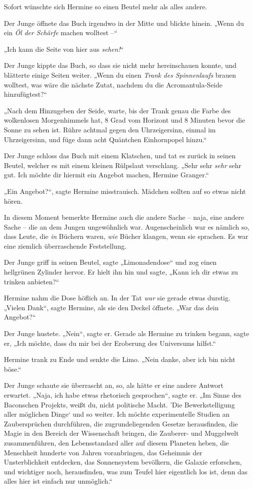 Sofort wünschte sich Hermine so einen Beutel mehr als alles andere. 

Der Junge öffnete das Buch irgendwo in der Mitte und blickte hinein. „Wenn du ein \emph{Öl der Schärfe} machen wolltest –“ 

„Ich kann die Seite von hier aus \emph{sehen!}“ 

Der Junge kippte das Buch, so dass sie nicht mehr hereinschauen konnte, und blätterte einige Seiten weiter. „Wenn du einen \emph{Trank des Spinnenlaufs} brauen wolltest, was wäre die nächste Zutat, nachdem du die Acromantula-Seide hinzufügtest?“ 

„Nach dem Hinzugeben der Seide, warte, bis der Trank genau die Farbe des wolkenlosen Morgenhimmels hat, 8 Grad vom Horizont und 8 Minuten bevor die Sonne zu sehen ist. Rühre achtmal gegen den Uhrzeigersinn, einmal im Uhrzeigersinn, und füge dann acht Quäntchen Einhornpopel hinzu.“ 

Der Junge schloss das Buch mit einem Klatschen, und tat es zurück in seinen Beutel, welcher es mit einem kleinen Rülpslaut verschlang. „Sehr sehr \emph{sehr} sehr gut. Ich möchte dir hiermit ein Angebot machen, Hermine Granger.“ 

„Ein Angebot?“, sagte Hermine misstrauisch. Mädchen sollten auf so etwas nicht hören. 

In diesem Moment bemerkte Hermine auch die andere Sache – naja, eine andere Sache – die an dem Jungen ungewöhnlich war. Augenscheinlich war es nämlich so, dass Leute, die \emph{in} Büchern waren, \emph{wie} Bücher klangen, wenn sie sprachen. Es war eine ziemlich überraschende Feststellung. 

Der Junge griff in seinen Beutel, sagte „Limonadendose“ und zog einen hellgrünen Zylinder hervor. Er hielt ihn hin und sagte, „Kann ich dir etwas zu trinken anbieten?“ 

Hermine nahm die Dose höflich an. In der Tat \emph{war} sie gerade etwas durstig. „Vielen Dank“, sagte Hermine, als sie den Deckel öffnete. „War das dein Angebot?“ 

Der Junge hustete. „Nein“, sagte er. Gerade als Hermine zu trinken begann, sagte er, „Ich möchte, dass du mir bei der Eroberung des Universums hilfst.“ 

Hermine trank zu Ende und senkte die Limo. „Nein danke, aber ich bin nicht böse.“ 

Der Junge schaute sie überrascht an, so, als hätte er eine andere Antwort erwartet. „Naja, ich habe etwas rhetorisch gesprochen“, sagte er. „Im Sinne des Baconschen Projekts, weißt du, nicht politische Macht. ’Die Bewerkstelligung aller möglichen Dinge‘ und so weiter. Ich möchte experimentelle Studien an Zaubersprüchen durchführen, die zugrundeliegenden Gesetze herausfinden, die Magie in den Bereich der Wissenschaft bringen, die Zauberer- und Muggelwelt zusammenführen, den Lebensstandard aller auf diesem Planeten heben, die Menschheit hunderte von Jahren voranbringen, das Geheimnis der Unsterblichkeit entdecken, das Sonnensystem bevölkern, die Galaxie erforschen, und wichtiger noch, herausfinden, was zum Teufel hier eigentlich los ist, denn das alles hier ist einfach nur unmöglich.“ 

